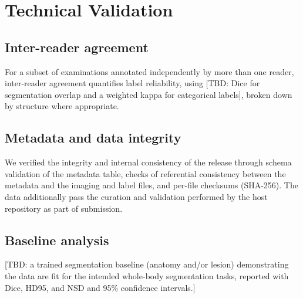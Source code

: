 
\section*{Technical Validation}\label{sec:validation}

\subsection*{Inter-reader agreement}\label{subsec:agreement}
For a subset of examinations annotated independently by more than one reader, inter-reader agreement quantifies label reliability, using [TBD: Dice for segmentation overlap and a weighted kappa for categorical labels], broken down by structure where appropriate.

\subsection*{Metadata and data integrity}\label{subsec:integrity}
We verified the integrity and internal consistency of the release through schema validation of the metadata table, checks of referential consistency between the metadata and the imaging and label files, and per-file checksums (SHA-256).
The data additionally pass the curation and validation performed by the host repository as part of submission.

\subsection*{Baseline analysis}\label{subsec:baseline}
[TBD: a trained segmentation baseline (anatomy and/or lesion) demonstrating the data are fit for the intended whole-body segmentation tasks, reported with Dice, HD95, and NSD and 95\% confidence intervals.]
